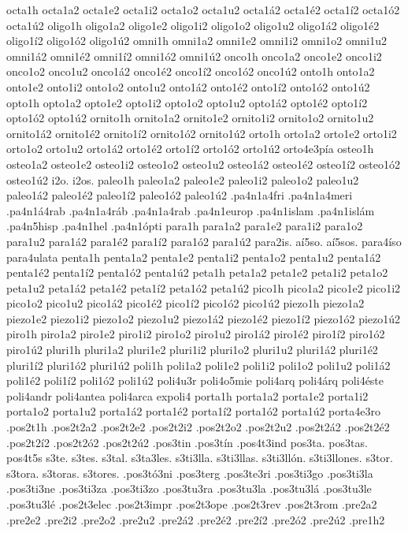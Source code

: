 {octa1h
octa1a2 octa1e2 octa1i2 octa1o2 octa1u2
octa1á2 octa1é2 octa1í2 octa1ó2 octa1ú2
oligo1h
oligo1a2 oligo1e2 oligo1i2 oligo1o2 oligo1u2
oligo1á2 oligo1é2 oligo1í2 oligo1ó2 oligo1ú2
omni1h
omni1a2 omni1e2 omni1i2 omni1o2 omni1u2
omni1á2 omni1é2 omni1í2 omni1ó2 omni1ú2
onco1h
onco1a2 onco1e2 onco1i2 onco1o2 onco1u2
onco1á2 onco1é2 onco1í2 onco1ó2 onco1ú2
onto1h
onto1a2 onto1e2 onto1i2 onto1o2 onto1u2
onto1á2 onto1é2 onto1í2 onto1ó2 onto1ú2
opto1h
opto1a2 opto1e2 opto1i2 opto1o2 opto1u2
opto1á2 opto1é2 opto1í2 opto1ó2 opto1ú2
ornito1h
ornito1a2 ornito1e2 ornito1i2 ornito1o2 ornito1u2
ornito1á2 ornito1é2 ornito1í2 ornito1ó2 ornito1ú2
orto1h
orto1a2 orto1e2 orto1i2 orto1o2 orto1u2
orto1á2 orto1é2 orto1í2 orto1ó2 orto1ú2
orto4e3pía
osteo1h
osteo1a2 osteo1e2 osteo1i2 osteo1o2 osteo1u2
osteo1á2 osteo1é2 osteo1í2 osteo1ó2 osteo1ú2
i2o.
i2os.
paleo1h
paleo1a2 paleo1e2 paleo1i2 paleo1o2 paleo1u2
paleo1á2 paleo1é2 paleo1í2 paleo1ó2 paleo1ú2
.pa4n1a4fri
.pa4n1a4meri
.pa4n1á4rab
.pa4n1a4ráb
.pa4n1a4rab
.pa4n1europ
.pa4n1islam
.pa4n1islám
.pa4n5hisp
.pa4n1hel
.pa4n1ópti
para1h
para1a2 para1e2 para1i2 para1o2 para1u2
para1á2 para1é2 para1í2 para1ó2 para1ú2
para2is.
aí5so.
aí5sos.
para4íso
para4ulata
penta1h
penta1a2 penta1e2 penta1i2 penta1o2 penta1u2
penta1á2 penta1é2 penta1í2 penta1ó2 penta1ú2
peta1h
peta1a2 peta1e2 peta1i2 peta1o2 peta1u2
peta1á2 peta1é2 peta1í2 peta1ó2 peta1ú2
pico1h
pico1a2 pico1e2 pico1i2 pico1o2 pico1u2
pico1á2 pico1é2 pico1í2 pico1ó2 pico1ú2
piezo1h
piezo1a2 piezo1e2 piezo1i2 piezo1o2 piezo1u2
piezo1á2 piezo1é2 piezo1í2 piezo1ó2 piezo1ú2
piro1h
piro1a2 piro1e2 piro1i2 piro1o2 piro1u2
piro1á2 piro1é2 piro1í2 piro1ó2 piro1ú2
pluri1h
pluri1a2 pluri1e2 pluri1i2 pluri1o2 pluri1u2
pluri1á2 pluri1é2 pluri1í2 pluri1ó2 pluri1ú2
poli1h
poli1a2 poli1e2 poli1i2 poli1o2 poli1u2
poli1á2 poli1é2 poli1í2 poli1ó2 poli1ú2
poli4u3r
poli4o5mie
poli4arq
poli4árq
poli4éste
poli4andr
poli4antea
poli4arca
expoli4
porta1h
porta1a2 porta1e2 porta1i2 porta1o2 porta1u2
porta1á2 porta1é2 porta1í2 porta1ó2 porta1ú2
porta4e3ro
.pos2t1h
.pos2t2a2 .pos2t2e2 .pos2t2i2 .pos2t2o2 .pos2t2u2
.pos2t2á2 .pos2t2é2 .pos2t2í2 .pos2t2ó2 .pos2t2ú2
.pos3tin
.pos3tín
.pos4t3ind
pos3ta.
pos3tas.
pos4t5s
s3te.
s3tes.
s3tal.
s3ta3les.
s3ti3lla.
s3ti3llas.
s3ti3llón.
s3ti3llones.
s3tor.
s3tora.
s3toras.
s3tores.
.pos3tó3ni
.pos3terg
.pos3te3ri
.pos3ti3go
.pos3ti3la
.pos3ti3ne
.pos3ti3za
.pos3ti3zo
.pos3tu3ra
.pos3tu3la
.pos3tu3lá
.pos3tu3le
.pos3tu3lé
.pos2t3elec
.pos2t3impr
.pos2t3ope
.pos2t3rev
.pos2t3rom
.pre2a2
.pre2e2
.pre2i2
.pre2o2
.pre2u2
.pre2á2
.pre2é2
.pre2í2
.pre2ó2
.pre2ú2
.pre1h2
}
